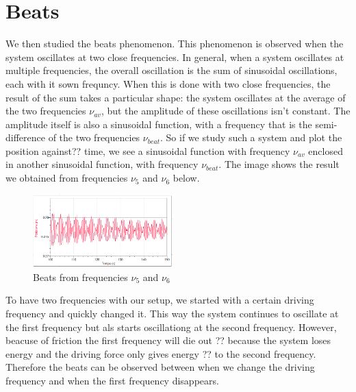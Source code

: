\documentclass{article}
\begin{document}
\section{Beats}
We then studied the beats phenomenon. This phenomenon is observed when the system oscillates at two close frequencies. In general, when a system oscillates at multiple frequencies, the overall oscillation is the sum of sinusoidal oscillations, each with it sown frequncy. When this is done with two close frequencies, the result of the sum takes a particular shape: the system oscillates at the average of the two frequencies $\nu_{av}$, but the amplitude of these oscillations isn't constant. The amplitude itself is also a sinusoidal function, with a frequency that is the semi-difference of the two frequencies $\nu_{beat}$. So if we study such a system and plot the position against?? time, we see a sinusoidal function with frequency $\nu_{av}$ enclosed in another sinusoidal function, with frequency $\nu_{beat}$. The image shows the result we obtained from frequencies $\nu_5$ and $\nu_6$ below.

\begin{figure}
  \begin{center}
    \includegraphics[width=0.48\textwidth]{battimenti_vicino_fase}
  \end{center}
  \label{img:beat}
  \caption{Beats from frequencies  $\nu_5$ and $\nu_6$}
\end{figure}

To have two frequencies with our setup, we started with a certain driving frequency and quickly changed it. This way the system continues to oscillate at the first frequency but als starts oscillationg at the second frequency. However, beacuse of friction the first frequency will die out ?? because the system loses energy and the driving force only gives energy ?? to the second frequency. Therefore the beats can be observed between when we change the driving frequency and when the first frequency disappears. 
\end{document}
